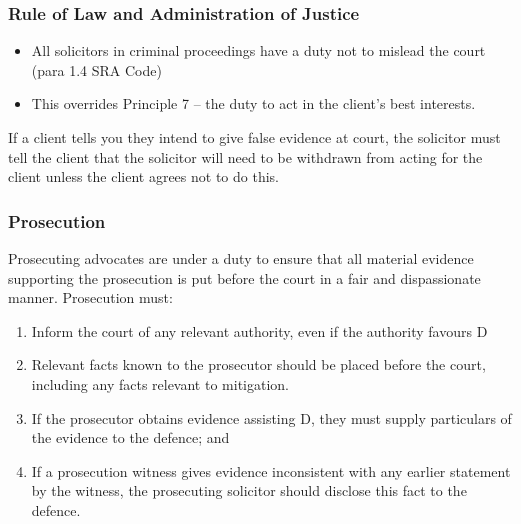 \documentclass[
]{article}
\newenvironment{Shaded}{}{}
\newcommand{\NormalTok}[1]{#1}
\providecommand{\tightlist}{%
  \setlength{\itemsep}{0pt}\setlength{\parskip}{0pt}}
\begin{document}
\hypertarget{rule-of-law-and-administration-of-justice}{%
\subsubsection{Rule of Law and Administration of
Justice}\label{rule-of-law-and-administration-of-justice}}

\begin{itemize}
\tightlist
\item
  All solicitors in criminal proceedings have a duty not to mislead the
  court (para 1.4 SRA Code)
\item
  This overrides Principle 7 -- the duty to act in the client's best
  interests.
\end{itemize}

\begin{Shaded}
\begin{Highlighting}[]
\NormalTok{If a client tells you they intend to give false evidence at court, the solicitor must tell the client that the solicitor will need to be withdrawn from acting for the client unless the client agrees not to do this. }
\end{Highlighting}
\end{Shaded}

\hypertarget{prosecution}{%
\subsubsection{Prosecution}\label{prosecution}}

Prosecuting advocates are under a duty to ensure that all material
evidence supporting the prosecution is put before the court in a fair
and dispassionate manner. Prosecution must:

\begin{enumerate}
\def\labelenumi{\arabic{enumi}.}
\tightlist
\item
  Inform the court of any relevant authority, even if the authority
  favours D
\item
  Relevant facts known to the prosecutor should be placed before the
  court, including any facts relevant to mitigation.
\item
  If the prosecutor obtains evidence assisting D, they must supply
  particulars of the evidence to the defence; and
\item
  If a prosecution witness gives evidence inconsistent with any earlier
  statement by the witness, the prosecuting solicitor should disclose
  this fact to the defence.
\end{enumerate}
\end{document}
